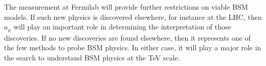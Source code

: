 The measurement at Fermilab will provide further restrictions on viable BSM models. If such new physics is discovered elsewhere, for instance at the LHC, then $a_{\mu}$ will play an important role in determining the interpretation of those discoveries. If no new discoveries are found elsewhere, then it represents one of the few methods to probe BSM physics. In either case, it will play a major role in the search to understand BSM physics at the TeV scale.





